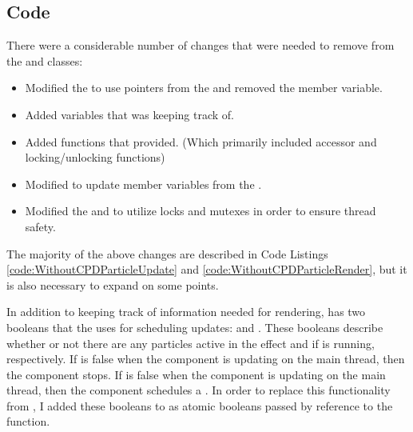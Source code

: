 \vspace{-0.3cm}
\subsection{Code}\label{ssec:observe_copies_code}

There were a considerable number of changes that were needed to remove  from the  and  classes:

\begin{itemize}[nolistsep,topsep=10pt]

	\item Modified the  to use pointers from the  and removed the  member variable.
	\item Added variables that  was keeping track of.
	\item Added functions that  provided. (Which primarily included accessor and locking/unlocking functions)
	\item Modified  to update member variables from the .
	\item Modified the  and  to utilize locks and mutexes in order to ensure thread safety.

\end{itemize}

The majority of the above changes are described in Code Listings \ref{code:WithoutCPDParticleUpdate} and \ref{code:WithoutCPDParticleRender}, but it is also necessary to expand on some points. 

In addition to keeping track of information needed for rendering,  has two booleans that the  uses for scheduling updates:  and . These booleans describe whether or not there are any particles active in the effect and if  is running, respectively. If  is false when the component is updating on the main thread, then the component stops\footnotemark $ $. If  is false when the component is updating on the main thread, then the component schedules a . In order to replace this functionality from , I added these booleans to  as atomic booleans passed by reference to the  function.\footnotemark

